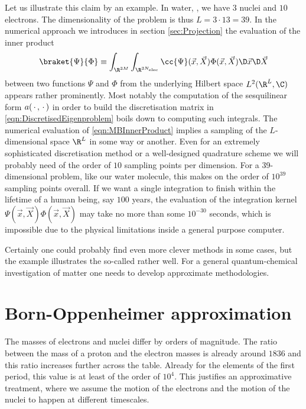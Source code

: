Let us illustrate this claim by an example.
In water, , we have $3$ nuclei and $10$ electrons.
The dimensionality of the problem is thus $L = 3 \cdot 13 = 39$.
In the numerical approach we introduces in section \vref{sec:Projection}
the evaluation of the inner product
\begin{equation}
	\braket{\Psi}{\Phi} \equiv \int_{\R^{3M}} \int_{\R^{3\Nelec}}
		\cc{\Psi}(\vec{x}, \vec{X}) \Phi(\vec{x}, \vec{X})
	\D \vec{x} \D \vec{X}
	\label{eqn:MBInnerProduct}
\end{equation}
between two functions $\Psi$ and $\Phi$ from the
underlying Hilbert space $L^2(\R^L, \C)$ appears rather prominently.
Most notably the computation of the sesquilinear form $a(\,\cdot\,,\,\cdot\,)$
in order to build the discretisation matrix in \eqref{eqn:DiscretisedEigenproblem}
boils down to computing such integrals.
The numerical evaluation of \eqref{eqn:MBInnerProduct}
implies a sampling of the $L$-dimensional space $\R^L$ in some way or another.
Even for an extremely sophisticated discretisation method
or a well-designed quadrature scheme we will probably need of the order of
$10$ sampling points per dimension.
For a 39-dimensional problem, like our water molecule,
this makes on the order of $10^{39}$ sampling points overall.
If we want a single integration to finish within the lifetime of a human being,
say $100$ years,
the evaluation of the
integration kernel $\Psi(\vec{x}, \vec{X}) \Phi(\vec{x}, \vec{X})$
may take no more than some $10^{-30}$ seconds,
which is impossible due to the physical limitations inside a general purpose computer.

Certainly one could probably find even more clever methods in some cases,
but the example illustrates the so-called  rather well.
For a general quantum-chemical investigation of matter
one needs to develop approximate methodologies.

\section{Born-Oppenheimer approximation}
\label{sec:BO}
The masses of electrons and nuclei differ by orders of magnitude.
The ratio between the mass of a proton and the electron masses
is already around $1836$ and this ratio increases
further across the table.
Already for the elements of the first period,
this value is at least of the order of $10^4$.
This justifies an approximative treatment,
where we assume the motion of the electrons
and the motion of the nuclei to happen at different timescales.


